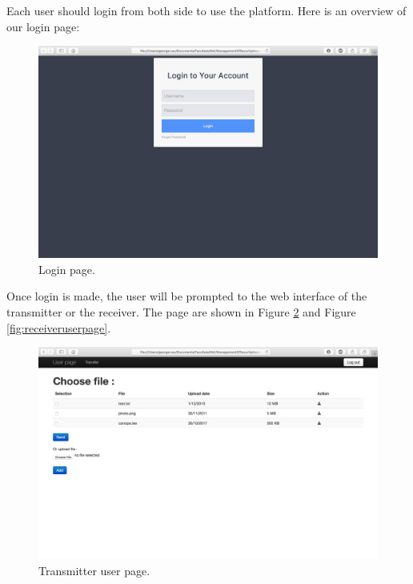 \documentclass[a4paper,10pt]{article}
\begin{document}
Each user should login from both side to use the platform. Here is an overview of our login page:

\begin{figure}[!h]
\centering
\includegraphics[scale=0.35]{images/login.png}
\caption{Login page.}
\label{fig:logpage}
\end{figure}

Once login is made, the user will be prompted to the web interface of the transmitter or the receiver. The page are shown in Figure \ref{fig:transuserpage} and Figure \ref{fig:receiveruserpage}.


\begin{figure}[!h]
\centering
\includegraphics[scale=0.35]{images/usertransmitter.png}
\caption{Transmitter user page.}
\label{fig:transuserpage}
\end{figure}
\end{document}
